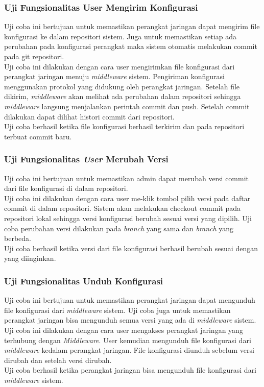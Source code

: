     	\subsubsection{Uji Fungsionalitas User Mengirim Konfigurasi}
    	Uji coba ini bertujuan untuk memastikan perangkat jaringan dapat mengirim file konfigurasi ke dalam repositori sistem. Juga untuk memastikan setiap ada perubahan pada konfigurasi perangkat maka sistem otomatis melakukan commit pada git repositori.\\
    	\indent Uji coba ini dilakukan dengan cara user mengirimkan file konfigurasi dari perangkat jaringan menuju \textit{middleware} sistem. Pengiriman konfigurasi menggunakan protokol yang didukung oleh perangkat jaringan. Setelah file dikirim, \textit{middleware} akan melihat ada perubahan dalam repositori sehingga \textit{middleware} langsung menjalankan perintah commit dan push. Setelah commit dilakukan dapat dilihat histori commit dari repositori.\\
    	\indent Uji coba berhasil ketika file konfigurasi berhasil terkirim dan pada repositori terbuat commit baru.
    	
    	\subsubsection{Uji Fungsionalitas \textit{User} Merubah Versi}
    	Uji coba ini bertujuan untuk memastikan admin dapat merubah versi commit dari file konfigurasi di dalam repositori.\\
    	\indent Uji coba ini dilakukan dengan cara user me-klik tombol pilih versi pada daftar commit di dalam repositori. Sistem akan melakukan checkout commit pada repositori lokal sehingga versi konfigurasi berubah sesuai versi yang dipilih. Uji coba perubahan versi dilakukan pada \textit{branch} yang sama dan \textit{branch} yang berbeda.\\
    	\indent Uji coba berhasil ketika versi dari file konfigurasi berhasil berubah sesuai dengan yang diinginkan.
    	
    	\subsubsection{Uji Fungsionalitas Unduh Konfigurasi}
    	Uji coba ini bertujuan untuk memastikan perangkat jaringan dapat mengunduh file konfigurasi dari \textit{middleware} sistem. Uji coba juga untuk memastikan perangkat jaringan bisa mengunduh semua versi yang ada di \textit{middleware} sistem. \\
    	\indent Uji coba ini dilakukan dengan cara user mengakses perangkat jaringan yang terhubung dengan \textit{Middleware}. User kemudian mengunduh file konfigurasi dari \textit{middleware} kedalam perangkat jaringan. File konfigurasi diunduh sebelum versi dirubah dan setelah versi dirubah. \\
    	\indent Uji coba berhasil ketika perangkat jaringan bisa mengunduh file konfigurasi dari \textit{middleware} sistem.
    	

